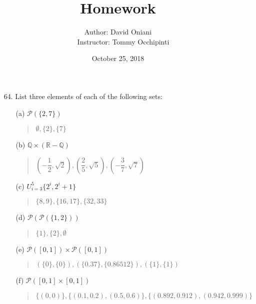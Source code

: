 \documentclass[12pt, a4paper]{article}                      %
\title{\bf{Homework \textnumero 9}}
\author{Author: David Oniani
\\
\ \ \ Instructor: Tommy Occhipinti}
\date{October 25, 2018}
\begin{document}
\maketitle
\begin{itemize}
\item[64.]
List three elements of each of the following sets:
\begin{itemize}
\item[(a)]
$\mathcal{P} (\{2, 7\})$
\begin{quote}
$\emptyset, \{2\}, \{7\}$
\end{quote}

\item[]

\item[(b)]
$\mathbb{Q} \times (\mathbb{R} - \mathbb{Q})$
\begin{quote}
$(-\dfrac{1}{2}, \sqrt{2}), (\dfrac{2}{5}, \sqrt{5}), (-\dfrac{3}{7}, \sqrt{7})$
\end{quote}

\item[]

\item[(c)]
$U_{i = 3}^5\{2^i, 2^i + 1\}$
\begin{quote}
$\{8, 9\}, \{16, 17\}, \{32, 33\}$
\end{quote}

\item[]

\item[(d)]
$\mathcal{P}(\mathcal{P}(\{1, 2\}))$
\begin{quote}
$\{1\}, \{2\}, \emptyset$
\end{quote}

\item[]

\item[(e)]
$\mathcal{P}([0, 1]) \times \mathcal{P}([0, 1])$
\begin{quote}
$(\{0\}, \{0\}), (\{0.37\}, \{0.86512\}), (\{1\}, \{1\})$
\end{quote}

\item[]

\item[(f)]
$\mathcal{P}([0, 1] \times [0, 1])$
\begin{quote}
$\{(0, 0)\}, \{(0.1, 0.2), (0.5, 0.6)\}, \{(0.892, 0.912), (0.942, 0.999)\}$
\end{quote}
\end{itemize}

\item[]
\item[]


\end{itemize}
\end{document}

